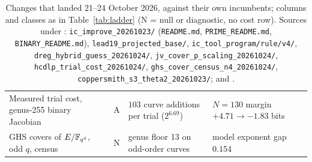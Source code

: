 \begin{table}[p]
\begin{tabularx}{\linewidth}{@{}>{\raggedright}Xl>{\raggedright}p{3.6cm}>{\raggedright\arraybackslash}p{3.2cm}@{}}
Measured trial cost, genus-255 binary Jacobian & A & $103$ curve additions per trial ($2^{6.69}$) & $N=130$ margin $+4.71\to-1.83$ bits \\
GHS covers of $E/\mathbb{F}_{q^4}$, odd $q$, census & N & genus floor 13 on odd-order curves & model exponent gap $0.154$ \\
\bottomrule
\end{tabularx}
\caption[]{Changes that landed 21--24 October 2026, against their own
incumbents; columns and classes as in Table~\ref{tab:ladder} (N = null or
diagnostic, no cost row). Sources under :
\texttt{ic\_improve\_20261023/} (\texttt{README.md},
\texttt{PRIME\_README.md}, \texttt{BINARY\_README.md}),
\texttt{lead19\_projected\_base/}, \texttt{ic\_tool\_program/rule/v4/},
\texttt{dreg\_hybrid\_guess\_20261024/}, \texttt{jv\_cover\_p\_scaling\_20261024/},
\texttt{hcdlp\_trial\_cost\_20261024/}, \texttt{ghs\_cover\_census\_n4\_20261024/},
\texttt{coppersmith\_s3\_theta2\_20261023/}; and
.}
\label{tab:ladder3}
\end{table}

